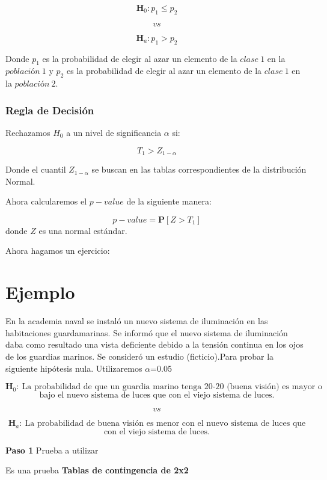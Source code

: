 \documentclass[
  a4paper,
  oneside,
  openany]{book}
\begin{document}
\[\textbf{H}_0: p_{1} \leq p_{2}\]

\[vs\]

\[\textbf{H}_a: p_{1} > p_{2}\]

Donde \(p_{1}\) es la probabilidad de elegir al azar un elemento de la \(clase\ 1\) en la \(población\ 1\) y \(p_{2}\) es la probabilidad de elegir al azar un elemento de la \(clase\ 1\) en la \(población\ 2\).

\hypertarget{regla-de-decisiuxf3n-23}{%
\subsubsection*{Regla de Decisión}\label{regla-de-decisiuxf3n-23}}


Rechazamos \(H_0\) a un nivel de significancia \(\alpha\) si:

\[T_{1} > Z_{1-\alpha}\]

Donde el cuantil \(Z_{1-\alpha}\) se buscan en las tablas correspondientes de la distribución Normal.

Ahora calcularemos el \(p-value\) de la siguiente manera:

\[p-value=\mathbf{P}[Z>T_{1}]\]
donde \(Z\) es una normal estándar.

Ahora hagamos un ejercicio:

\hypertarget{ejemplo-10}{%
\section{Ejemplo}\label{ejemplo-10}}

En la academia naval se instaló un nuevo sistema de iluminación en las habitaciones guardamarinas. Se informó que el nuevo sistema de iluminación daba como resultado una vista deficiente debido a la tensión continua en los ojos de los guardias marinos. Se consideró un estudio (ficticio).Para probar la siguiente hipótesis nula. Utilizaremos \(\alpha\)=0.05

\[\textbf{H}_0: \ \mbox{La probabilidad de que un guardia marino tenga 20-20 (buena visión) es mayor o igual}\]
\[\mbox{bajo el nuevo sistema de luces que con el viejo sistema de luces.}\]

\[vs\]

\[\textbf{H}_a: \ \mbox{La probabilidad de buena visión es menor con el nuevo sistema de luces que}\]
\[\mbox{con el viejo sistema de luces.}\]

\textbf{Paso 1} Prueba a utilizar

Es una prueba \textbf{Tablas de contingencia de 2x2}
\end{document}
